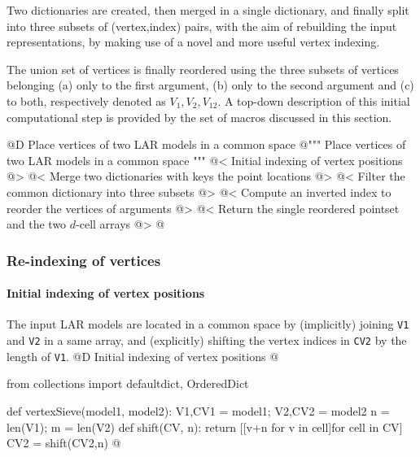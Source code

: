 \documentclass[11pt,oneside]{article}	%
\begin{document}
Two dictionaries are created, then merged in a single dictionary, and finally split into three subsets of (vertex,index) pairs, with the aim of rebuilding the input representations, by making use of a novel and more useful vertex indexing.

The union set of vertices is finally reordered using the three subsets of vertices belonging (a) only to the first argument, (b) only to the second argument and (c) to both, respectively denoted as $V_1, V_2, V_{12}$. A top-down description of this initial computational step is provided by the set of macros discussed in this section.

@D Place vertices of two LAR models in a common space
@{""" Place vertices of two LAR models in a common space """
@< Initial indexing of vertex positions @>
@< Merge two dictionaries with keys the point locations @>
@< Filter the common dictionary into three subsets @>
@< Compute an inverted index to reorder the vertices of arguments @>
@< Return the single reordered pointset and the two $d$-cell arrays @>
@}

\subsubsection{Re-indexing of vertices}

\paragraph{Initial indexing of vertex positions}
The input LAR models are located in a common space by (implicitly) joining \texttt{V1} and \texttt{V2} in a same array, and (explicitly) shifting the vertex indices in \texttt{CV2} by the length of \texttt{V1}.
@D Initial indexing of vertex positions
@{from collections import defaultdict, OrderedDict

def vertexSieve(model1, model2):
	V1,CV1 = model1; V2,CV2 = model2
	n = len(V1); m = len(V2)
	def shift(CV, n): 
		return [[v+n for v in cell]for cell in CV]
	CV2 = shift(CV2,n)
@}
\end{document}
